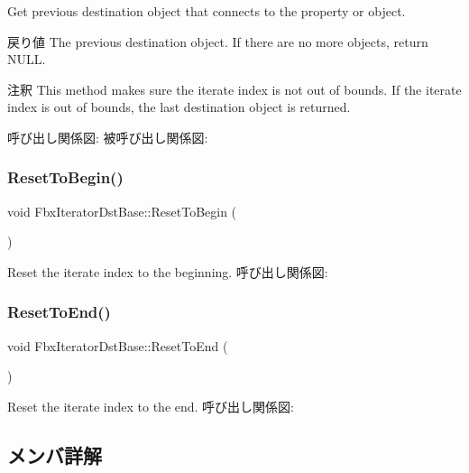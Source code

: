 Get previous destination object that connects to the property or object. \begin{DoxyReturn}{戻り値}
The previous destination object. If there are no more objects, return N\+U\+LL. 
\end{DoxyReturn}
\begin{DoxyRemark}{注釈}
This method makes sure the iterate index is not out of bounds. If the iterate index is out of bounds, the last destination object is returned. 
\end{DoxyRemark}
呼び出し関係図\+:
被呼び出し関係図\+:
\mbox{\label{class_fbx_iterator_dst_base_aa732906f31b3b79c5380186d02cb7159}} 
\subsubsection{\texorpdfstring{Reset\+To\+Begin()}{ResetToBegin()}}
{\footnotesize\ttfamily void Fbx\+Iterator\+Dst\+Base\+::\+Reset\+To\+Begin (\begin{DoxyParamCaption}{ }\end{DoxyParamCaption})\hspace{0.3cm}{\ttfamily [protected]}}

Reset the iterate index to the beginning. 呼び出し関係図\+:
\mbox{\label{class_fbx_iterator_dst_base_ab742852e3955c14f6299f6104120c2d2}} 
\subsubsection{\texorpdfstring{Reset\+To\+End()}{ResetToEnd()}}
{\footnotesize\ttfamily void Fbx\+Iterator\+Dst\+Base\+::\+Reset\+To\+End (\begin{DoxyParamCaption}{ }\end{DoxyParamCaption})\hspace{0.3cm}{\ttfamily [protected]}}

Reset the iterate index to the end. 呼び出し関係図\+:


\subsection{メンバ詳解}
\mbox{\label{class_fbx_iterator_dst_base_a6de7e7773a295d5cd2cf5e1dbb1e355a}} 

